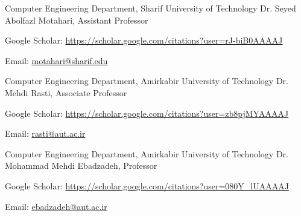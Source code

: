 

\begin{cventries}

  \cventry
    {Computer Engineering Department, Sharif University of Technology} %
    {Dr. Seyed Abolfazl Motahari, Assistant Professor} %
    {} %
    {} %
    {
      \begin{cvitems} %
        \item {Google Scholar: \href{https://scholar.google.com/citations?user=rJ-biB0AAAAJ&hl=en}{https://scholar.google.com/citations?user=rJ-biB0AAAAJ}}
        \item {Email: \href{mailto:motahari@sharif.edu}{motahari@sharif.edu}}
      \end{cvitems}
    }

  \cventry
    {Computer Engineering Department, Amirkabir University of Technology} %
    {Dr. Mehdi Rasti, Associate Professor} %
    {} %
    {} %
    {
      \begin{cvitems} %
        \item {Google Scholar: \href{https://scholar.google.com/citations?user=zb8pjMYAAAAJ&hl=en}{https://scholar.google.com/citations?user=zb8pjMYAAAAJ}}
        \item {Email: \href{mailto:rasti@aut.ac.ir}{rasti@aut.ac.ir}}
      \end{cvitems}
    }

  \cventry
    {Computer Engineering Department, Amirkabir University of Technology} %
    {Dr. Mohammad Mehdi Ebadzadeh, Professor} %
    {} %
    {} %
    {
      \begin{cvitems} %
        \item {Google Scholar: \href{https://scholar.google.com/citations?user=080Y\_lUAAAAJ&hl=en}{https://scholar.google.com/citations?user=080Y\_lUAAAAJ}}
        \item {Email: \href{mailto:ebadzadeh@aut.ac.ir}{ebadzadeh@aut.ac.ir}}
      \end{cvitems}
    }


\end{cventries}
